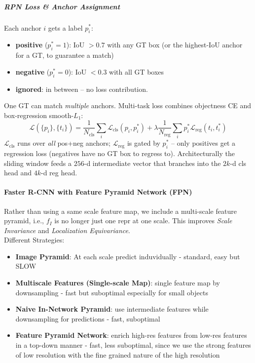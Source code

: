 \documentclass{article}
\begin{document}
\subparagraph{RPN Loss \& Anchor Assignment}
Each anchor $i$ gets a label $p_i^*$:
\begin{itemize}
    \item \textbf{positive} ($p_i^* = 1$): IoU $>0.7$ with any GT box (or the highest-IoU anchor for a GT, to guarantee a match)
    \item \textbf{negative} ($p_i^* = 0$): IoU $<0.3$ with all GT boxes
    \item \textbf{ignored}: in between -- no loss contribution.
\end{itemize}
One GT can match \textit{multiple} anchors. Multi-task loss combines objectness CE and box-regression smooth-$L_1$:
$$
\mathcal{L}(\{p_i\},\{t_i\}) = \frac{1}{N_\text{cls}} \sum_i \mathcal{L}_\text{cls}(p_i, p_i^*) + \lambda \frac{1}{N_\text{reg}} \sum_i p_i^* \mathcal{L}_\text{reg}(t_i, t_i^*)
$$
$\mathcal{L}_\text{cls}$ runs over \textit{all} pos+neg anchors; $\mathcal{L}_\text{reg}$ is gated by $p_i^*$ -- only positives get a regression loss (negatives have no GT box to regress to). Architecturally the sliding window feeds a $256$-d intermediate vector that branches into the $2k$-d cls head and $4k$-d reg head.


\paragraph{Faster R-CNN with Feature Pyramid Network (FPN)}
Rather than using a same scale feature map, we include a multi-scale feature pyramid, i.e., $f_I$ is no longer just one repr at one scale. 
This improves \textit{Scale Invariance} and \textit{Localization Equivariance}.\\

Different Strategies:
\begin{itemize}
    \item \textbf{Image Pyramid}: At each scale predict induvidually - standard, easy but SLOW
    \item \textbf{Multiscale Features (Single-scale Map)}: single feature map by downsampling - fast but suboptimal especially for small objects
    \item \textbf{Naive In-Network Pyramid}: use intermediate features while downsampling for predictions - fast, suboptimal
    \item \textbf{Feature Pyramid Network}: enrich high-res features from low-res features in a top-down manner - fast, less suboptimal, since we use the strong features of low resolution with the fine grained nature of the high resolution
\end{itemize}
\end{document}
